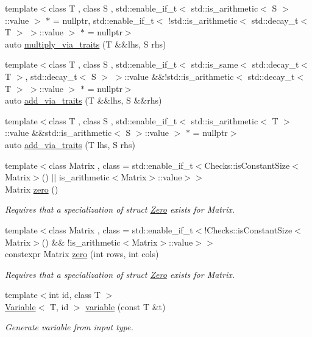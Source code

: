 \begin{DoxyCompactItemize}
\item 
{\footnotesize template$<$class T , class S , std\+::enable\+\_\+if\+\_\+t$<$ std\+::is\+\_\+arithmetic$<$ S $>$\+::value $>$ $\ast$  = nullptr, std\+::enable\+\_\+if\+\_\+t$<$ !std\+::is\+\_\+arithmetic$<$ std\+::decay\+\_\+t$<$ T $>$ $>$\+::value $>$ $\ast$  = nullptr$>$ }\\auto \hyperlink{namespaceFunG_af9f50220300eacbd554ec4b48373535b}{multiply\+\_\+via\+\_\+traits} (T \&\&lhs, S rhs)
\item 
{\footnotesize template$<$class T , class S , std\+::enable\+\_\+if\+\_\+t$<$ std\+::is\+\_\+same$<$ std\+::decay\+\_\+t$<$ T $>$, std\+::decay\+\_\+t$<$ S $>$ $>$\+::value \&\&!std\+::is\+\_\+arithmetic$<$ std\+::decay\+\_\+t$<$ T $>$ $>$\+::value $>$ $\ast$  = nullptr$>$ }\\auto \hyperlink{namespaceFunG_a1aa47c6870754d5d74100568cd3ef532}{add\+\_\+via\+\_\+traits} (T \&\&lhs, S \&\&rhs)
\item 
{\footnotesize template$<$class T , class S , std\+::enable\+\_\+if\+\_\+t$<$ std\+::is\+\_\+arithmetic$<$ T $>$\+::value \&\&std\+::is\+\_\+arithmetic$<$ S $>$\+::value $>$ $\ast$  = nullptr$>$ }\\auto \hyperlink{namespaceFunG_a6cbaa3b1b61e5834b38db5c831e3c25e}{add\+\_\+via\+\_\+traits} (T lhs, S rhs)
\item 
{\footnotesize template$<$class Matrix , class  = std\+::enable\+\_\+if\+\_\+t$<$\+Checks\+::is\+Constant\+Size$<$\+Matrix$>$() $\vert$$\vert$ is\+\_\+arithmetic$<$\+Matrix$>$\+::value$>$$>$ }\\Matrix \hyperlink{namespaceFunG_a649b4470d6def401959bfea3a368c48c}{zero} ()
\begin{DoxyCompactList}\small\item\em Requires that a specialization of struct \hyperlink{structFunG_1_1Zero}{Zero} exists for Matrix. \end{DoxyCompactList}\item 
{\footnotesize template$<$class Matrix , class  = std\+::enable\+\_\+if\+\_\+t$<$!\+Checks\+::is\+Constant\+Size$<$\+Matrix$>$() \&\& !is\+\_\+arithmetic$<$\+Matrix$>$\+::value$>$$>$ }\\constexpr Matrix \hyperlink{namespaceFunG_ae633433339ba30207aa526e54e3924b4}{zero} (int rows, int cols)
\begin{DoxyCompactList}\small\item\em Requires that a specialization of struct \hyperlink{structFunG_1_1Zero}{Zero} exists for Matrix. \end{DoxyCompactList}\item 
{\footnotesize template$<$int id, class T $>$ }\\\hyperlink{structFunG_1_1Variable}{Variable}$<$ T, id $>$ \hyperlink{namespaceFunG_a2ead025b35a8cdf3ac8c170524ab61c0}{variable} (const T \&t)
\begin{DoxyCompactList}\small\item\em Generate variable from input type. \end{DoxyCompactList}\end{DoxyCompactItemize}


